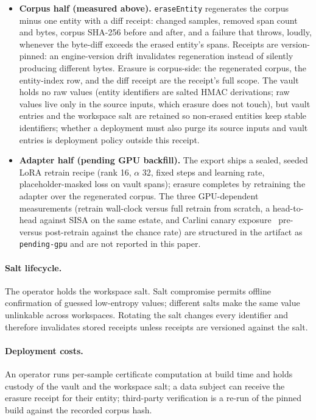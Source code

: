 \documentclass{article}
\begin{document}
\begin{itemize}
  \item \textbf{Corpus half (measured above).} \texttt{eraseEntity} regenerates the corpus minus one entity with a diff receipt: changed samples, removed span count and bytes, corpus SHA-256 before and after, and a failure that throws, loudly, whenever the byte-diff exceeds the erased entity's spans. Receipts are version-pinned: an engine-version drift invalidates regeneration instead of silently producing different bytes. Erasure is corpus-side: the regenerated corpus, the entity-index row, and the diff receipt are the receipt's full scope. The vault holds no raw values (entity identifiers are salted HMAC derivations; raw values live only in the source inputs, which erasure does not touch), but vault entries and the workspace salt are retained so non-erased entities keep stable identifiers; whether a deployment must also purge its source inputs and vault entries is deployment policy outside this receipt.
  \item \textbf{Adapter half (pending GPU backfill).} The export ships a sealed, seeded LoRA retrain recipe (rank 16, $\alpha$ 32, fixed steps and learning rate, placeholder-masked loss on vault spans); erasure completes by retraining the adapter over the regenerated corpus. The three GPU-dependent measurements (retrain wall-clock versus full retrain from scratch, a head-to-head against SISA on the same estate, and Carlini canary exposure~\cite{carlini_secret_sharer} pre- versus post-retrain against the chance rate) are structured in the artifact as \texttt{pending-gpu} and are not reported in this paper.
\end{itemize}

\paragraph{Salt lifecycle.}
The operator holds the workspace salt. Salt compromise permits offline confirmation of guessed low-entropy values; different salts make the same value unlinkable across workspaces. Rotating the salt changes every identifier and therefore invalidates stored receipts unless receipts are versioned against the salt.

\paragraph{Deployment costs.}
An operator runs per-sample certificate computation at build time and holds custody of the vault and the workspace salt; a data subject can receive the erasure receipt for their entity; third-party verification is a re-run of the pinned build against the recorded corpus hash.
\end{document}
